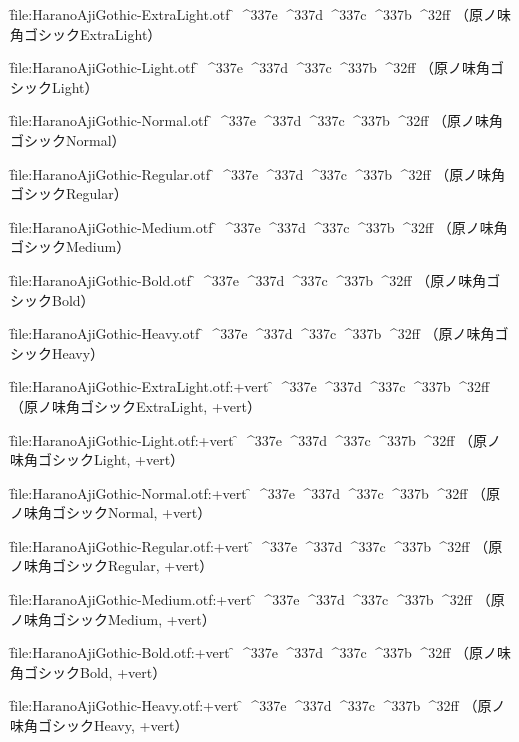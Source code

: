

\nopagenumbers

\font\f{file:HaranoAjiGothic-ExtraLight.otf} \f
^^^^337e
^^^^337d
^^^^337c
^^^^337b
^^^^32ff
（原ノ味角ゴシックExtraLight）\par

\font\f{file:HaranoAjiGothic-Light.otf} \f
^^^^337e
^^^^337d
^^^^337c
^^^^337b
^^^^32ff
（原ノ味角ゴシックLight）\par

\font\f{file:HaranoAjiGothic-Normal.otf} \f
^^^^337e
^^^^337d
^^^^337c
^^^^337b
^^^^32ff
（原ノ味角ゴシックNormal）\par

\font\f{file:HaranoAjiGothic-Regular.otf} \f
^^^^337e
^^^^337d
^^^^337c
^^^^337b
^^^^32ff
（原ノ味角ゴシックRegular）\par

\font\f{file:HaranoAjiGothic-Medium.otf} \f
^^^^337e
^^^^337d
^^^^337c
^^^^337b
^^^^32ff
（原ノ味角ゴシックMedium）\par

\font\f{file:HaranoAjiGothic-Bold.otf} \f
^^^^337e
^^^^337d
^^^^337c
^^^^337b
^^^^32ff
（原ノ味角ゴシックBold）\par

\font\f{file:HaranoAjiGothic-Heavy.otf} \f
^^^^337e
^^^^337d
^^^^337c
^^^^337b
^^^^32ff
（原ノ味角ゴシックHeavy）\par


\font\f{file:HaranoAjiGothic-ExtraLight.otf:+vert} \f
^^^^337e
^^^^337d
^^^^337c
^^^^337b
^^^^32ff
（原ノ味角ゴシックExtraLight, +vert）\par

\font\f{file:HaranoAjiGothic-Light.otf:+vert} \f
^^^^337e
^^^^337d
^^^^337c
^^^^337b
^^^^32ff
（原ノ味角ゴシックLight, +vert）\par

\font\f{file:HaranoAjiGothic-Normal.otf:+vert} \f
^^^^337e
^^^^337d
^^^^337c
^^^^337b
^^^^32ff
（原ノ味角ゴシックNormal, +vert）\par

\font\f{file:HaranoAjiGothic-Regular.otf:+vert} \f
^^^^337e
^^^^337d
^^^^337c
^^^^337b
^^^^32ff
（原ノ味角ゴシックRegular, +vert）\par

\font\f{file:HaranoAjiGothic-Medium.otf:+vert} \f
^^^^337e
^^^^337d
^^^^337c
^^^^337b
^^^^32ff
（原ノ味角ゴシックMedium, +vert）\par

\font\f{file:HaranoAjiGothic-Bold.otf:+vert} \f
^^^^337e
^^^^337d
^^^^337c
^^^^337b
^^^^32ff
（原ノ味角ゴシックBold, +vert）\par

\font\f{file:HaranoAjiGothic-Heavy.otf:+vert} \f
^^^^337e
^^^^337d
^^^^337c
^^^^337b
^^^^32ff
（原ノ味角ゴシックHeavy, +vert）\par


